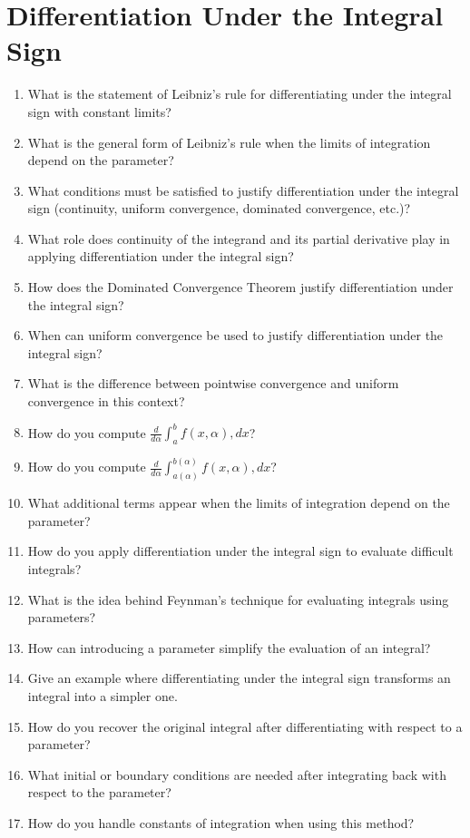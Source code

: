 \section{Differentiation Under the Integral Sign}
\begin{enumerate}
  \item What is the statement of Leibniz's rule for differentiating under the integral sign with constant limits?
  \item What is the general form of Leibniz's rule when the limits of integration depend on the parameter?
  \item What conditions must be satisfied to justify differentiation under the integral sign (continuity, uniform convergence, dominated convergence, etc.)?
  \item What role does continuity of the integrand and its partial derivative play in applying differentiation under the integral sign?
  \item How does the Dominated Convergence Theorem justify differentiation under the integral sign?
  \item When can uniform convergence be used to justify differentiation under the integral sign?
  \item What is the difference between pointwise convergence and uniform convergence in this context?
  \item How do you compute $\frac{d}{d\alpha} \int_a^b f(x,\alpha),dx$?
  \item How do you compute $\frac{d}{d\alpha} \int_{a(\alpha)}^{b(\alpha)} f(x,\alpha),dx$?
  \item What additional terms appear when the limits of integration depend on the parameter?
  \item How do you apply differentiation under the integral sign to evaluate difficult integrals?
  \item What is the idea behind Feynman's technique for evaluating integrals using parameters?
  \item How can introducing a parameter simplify the evaluation of an integral?
  \item Give an example where differentiating under the integral sign transforms an integral into a simpler one.
  \item How do you recover the original integral after differentiating with respect to a parameter?
  \item What initial or boundary conditions are needed after integrating back with respect to the parameter?
  \item How do you handle constants of integration when using this method?

\end{enumerate}
